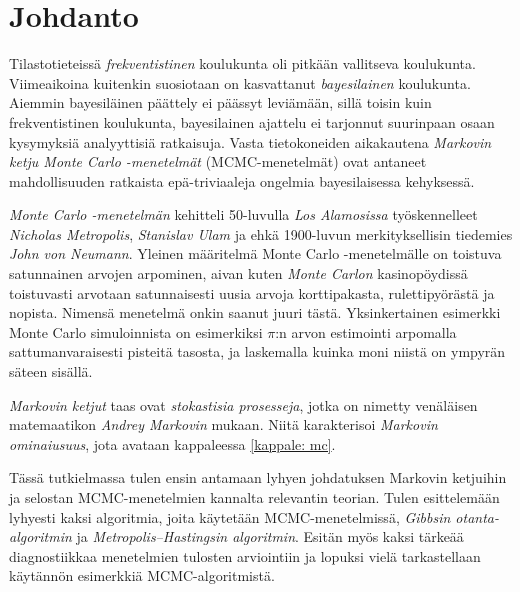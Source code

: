 \chapter{Johdanto}\label{johd}

Tilastotieteissä \textit{frekventistinen} koulukunta oli pitkään vallitseva koulukunta. Viimeaikoina kuitenkin suosiotaan on kasvattanut \emph{bayesilainen} koulukunta. Aiemmin bayesiläinen päättely ei päässyt leviämään, sillä toisin kuin frekventistinen koulukunta, bayesilainen ajattelu ei tarjonnut suurinpaan osaan kysymyksiä analyyttisiä ratkaisuja. Vasta tietokoneiden aikakautena \textit{Markovin ketju Monte Carlo -menetelmät} (MCMC-menetelmät) ovat antaneet mahdollisuuden ratkaista epä-triviaaleja ongelmia bayesilaisessa kehyksessä.

\emph{Monte Carlo -menetelmän} kehitteli 50-luvulla \textit{Los Alamosissa} työskennelleet \textit{Nicholas Metropolis}, \textit{Stanislav Ulam} ja ehkä 1900-luvun merkityksellisin tiedemies \textit{John von Neumann}. Yleinen määritelmä Monte Carlo -menetelmälle on toistuva satunnainen arvojen arpominen, aivan kuten \emph{Monte Carlon} kasinopöydissä toistuvasti arvotaan satunnaisesti uusia arvoja korttipakasta, rulettipyörästä ja nopista. Nimensä menetelmä onkin saanut juuri tästä. Yksinkertainen esimerkki Monte Carlo simuloinnista on esimerkiksi $\pi$:n arvon estimointi arpomalla sattumanvaraisesti pisteitä tasosta, ja laskemalla kuinka moni niistä on ympyrän säteen sisällä. 

\textit{Markovin ketjut} taas ovat \textit{stokastisia prosesseja}, jotka on nimetty venäläisen matemaatikon \textit{Andrey Markovin} mukaan. Niitä karakterisoi \emph{Markovin ominaiusuus}, jota avataan kappaleessa \ref{kappale: mc}.

Tässä tutkielmassa tulen ensin antamaan lyhyen johdatuksen Markovin ketjuihin ja selostan MCMC-menetelmien kannalta relevantin teorian. Tulen esittelemään lyhyesti kaksi algoritmia, joita käytetään MCMC-menetelmissä, \textit{Gibbsin otanta-algoritmin} ja \textit{Metropolis–Hastingsin algoritmin}. Esitän myös kaksi tärkeää diagnostiikkaa menetelmien tulosten arviointiin ja lopuksi vielä tarkastellaan käytännön esimerkkiä MCMC-algoritmistä.
